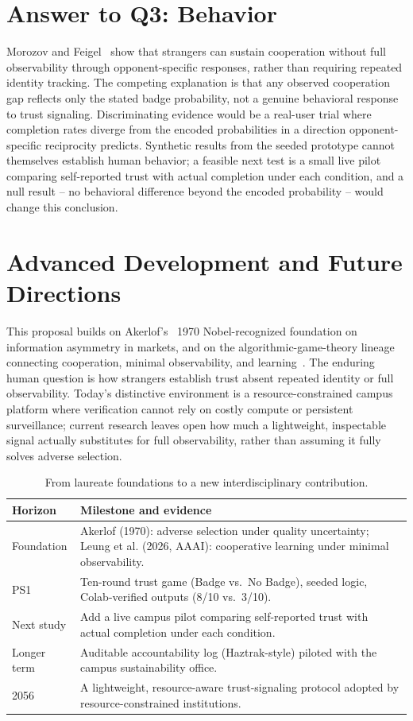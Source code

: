 \clearpage\balance
\section{Answer to Q3: Behavior}
Morozov and Feigel~\cite{morozovfeigel2026} show that strangers can sustain cooperation without full observability through opponent-specific responses, rather than requiring repeated identity tracking. The competing explanation is that any observed cooperation gap reflects only the stated badge probability, not a genuine behavioral response to trust signaling. Discriminating evidence would be a real-user trial where completion rates diverge from the encoded probabilities in a direction opponent-specific reciprocity predicts. Synthetic results from the seeded prototype cannot themselves establish human behavior; a feasible next test is a small live pilot comparing self-reported trust with actual completion under each condition, and a null result -- no behavioral difference beyond the encoded probability -- would change this conclusion.

\section{Advanced Development and Future Directions}
This proposal builds on Akerlof's~\cite{akerlof1970} 1970 Nobel-recognized foundation on information asymmetry in markets, and on the algorithmic-game-theory lineage connecting cooperation, minimal observability, and learning~\cite{leungetal2026}. The enduring human question is how strangers establish trust absent repeated identity or full observability. Today's distinctive environment is a resource-constrained campus platform where verification cannot rely on costly compute or persistent surveillance; current research leaves open how much a lightweight, inspectable signal actually substitutes for full observability, rather than assuming it fully solves adverse selection.

\begin{table}[h]\caption{From laureate foundations to a new interdisciplinary contribution.}
\begin{tabularx}{\columnwidth}{@{}p{1.6cm}Y@{}}\toprule
\textbf{Horizon}&\textbf{Milestone and evidence}\\\midrule
Foundation&Akerlof (1970): adverse selection under quality uncertainty; Leung et al. (2026, AAAI): cooperative learning under minimal observability.\\
PS1&Ten-round trust game (Badge vs.\ No Badge), seeded logic, Colab-verified outputs (8/10 vs.\ 3/10).\\
Next study&Add a live campus pilot comparing self-reported trust with actual completion under each condition.\\
Longer term&Auditable accountability log (Haztrak-style) piloted with the campus sustainability office.\\
2056&A lightweight, resource-aware trust-signaling protocol adopted by resource-constrained institutions.\\\bottomrule
\end{tabularx}\end{table}

